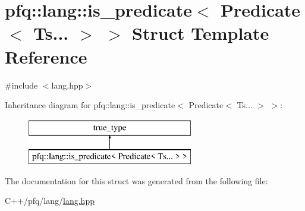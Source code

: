 \hypertarget{structpfq_1_1lang_1_1is__predicate_3_01Predicate_3_01Ts_8_8_8_01_4_01_4}{}\section{pfq\+:\+:lang\+:\+:is\+\_\+predicate$<$ Predicate$<$ Ts... $>$ $>$ Struct Template Reference}
\label{structpfq_1_1lang_1_1is__predicate_3_01Predicate_3_01Ts_8_8_8_01_4_01_4}


{\ttfamily \#include $<$lang.\+hpp$>$}

Inheritance diagram for pfq\+:\+:lang\+:\+:is\+\_\+predicate$<$ Predicate$<$ Ts... $>$ $>$\+:\begin{figure}[H]
\begin{center}
\leavevmode
\includegraphics[height=2.000000cm]{structpfq_1_1lang_1_1is__predicate_3_01Predicate_3_01Ts_8_8_8_01_4_01_4}
\end{center}
\end{figure}


The documentation for this struct was generated from the following file\+:\begin{DoxyCompactItemize}
\item 
C++/pfq/lang/\hyperlink{lang_8hpp}{lang.\+hpp}\end{DoxyCompactItemize}
